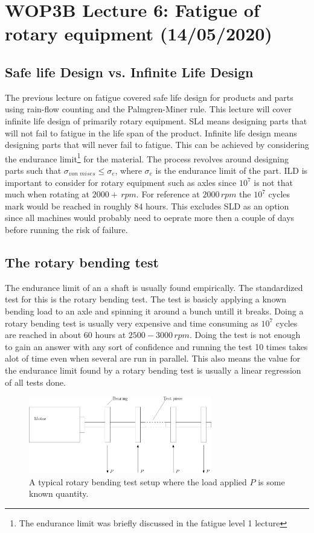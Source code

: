 \documentclass[11pt, a4paper]{article}
\begin{document}
\setcounter{section}{5} 
\setcounter{equation}{0}

\section{WOP3B Lecture 6: Fatigue of rotary equipment (14/05/2020)}


\subsection{Safe life Design vs. Infinite Life Design}
The previous lecture on fatigue covered safe life design for products and parts using rain-flow counting and the Palmgren-Miner rule. This lecture will cover infinite life design of primarily rotary equipment. SLd means designing parts that will not fail to fatigue in the life span of the product. Infinite life design means designing parts that will never fail to fatigue. This can be achieved by considering the endurance limit\footnote{The endurance limit was briefly discussed in the fatigue level 1 lecture} for the material. The process revolves around designing parts such that $\sigma_{von\;mises} \leq \sigma_e$, where $\sigma_e$ is the endurance limit of the part. ILD is important to consider for rotary equipment such as axles since $10^7$ is not that much when rotating at $2000+\,rpm$. For reference at $2000\,rpm$ the $10^7$ cycles mark would be reached in roughly $84$ hours. This excludes SLD as an option since all machines would probably need to oeprate more then a couple of days before running the risk of failure.


\subsection{The rotary bending test}
The endurance limit of an a shaft is usually found empirically. The standardized test for this is the rotary bending test. The test is basicly applying a known bending load to an axle and spinning it around a bunch untill it breaks. Doing a rotary bending test is usually very expensive and time consuming as $10^7$ cycles are reached in about $60$ hours at $2500-3000\,rpm$. Doing the test is not enough to gain an answer with any sort of confidence and running the test 10 times takes alot of time even when several are run in parallel. This also means the value for the endurance limit found by a rotary bending test is usually a linear regression of all tests done.
\begin{figure}[h]
  \centerline{\includegraphics[width=80mm]{images/RotaryTest.png}}
  \caption{A typical rotary bending test setup where the load applied $P$ is some known quantity.}
\end{figure}
\end{document}
